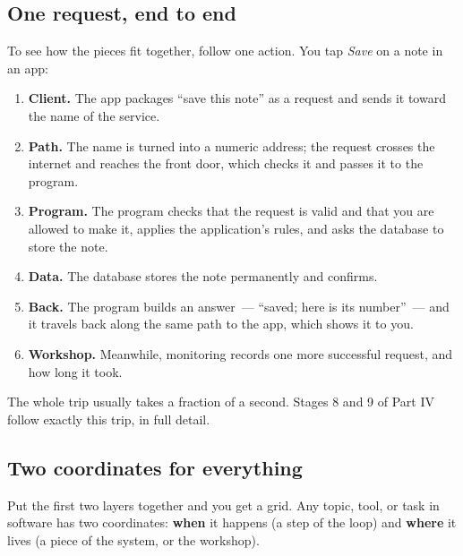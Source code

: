 \subsection*{One request, end to end}\label{how-software-gets-built:one-request-end-to-end}

To see how the pieces fit together, follow one action. You tap \emph{Save} on a note in an app:

\begin{enumerate}
\def\labelenumi{\arabic{enumi}.}
\tightlist
\item
  \textbf{Client.} The app packages ``save this note'' as a request and sends it toward the name of the service.
\item
  \textbf{Path.} The name is turned into a numeric address; the request crosses the internet and reaches the front door, which checks it and passes it to the program.
\item
  \textbf{Program.} The program checks that the request is valid and that you are allowed to make it, applies the application's rules, and asks the database to store the note.
\item
  \textbf{Data.} The database stores the note permanently and confirms.
\item
  \textbf{Back.} The program builds an answer~--- ``saved; here is its number''~--- and it travels back along the same path to the app, which shows it to you.
\item
  \textbf{Workshop.} Meanwhile, monitoring records one more successful request, and how long it took.
\end{enumerate}

\noindent{}The whole trip usually takes a fraction of a second. Stages 8 and 9 of Part IV follow exactly this trip, in full detail.

\subsection*{Two coordinates for everything}\label{how-software-gets-built:two-coordinates-for-everything}

Put the first two layers together and you get a grid. Any topic, tool, or task in software has two coordinates: \textbf{when} it happens (a step of the loop) and \textbf{where} it lives (a piece of the system, or the workshop).


